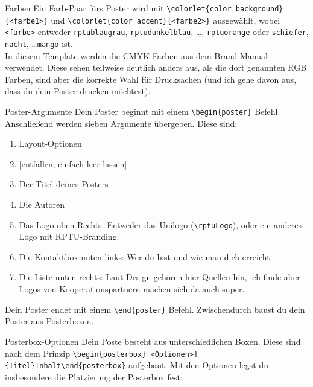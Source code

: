 \documentclass[
  a0paper,
  portrait,
  fontscale=.35 %
  ]{baposterrptu}
\begin{document}
\begin{poster}
\begin{posterbox}[name=farben,column=1,row=0]{Farben}
    Ein Farb-Paar fürs Poster wird mit \lstinline!\colorlet{color_background}{<farbe1>}! und \lstinline!\colorlet{color_accent}{<farbe2>}! ausgewählt, wobei \lstinline!<farbe>! entweder \lstinline!rptublaugrau!, \lstinline!rptudunkelblau!, \dots, \lstinline!rptuorange! oder \lstinline!schiefer!, \lstinline!nacht!, \dots \lstinline!mango! ist.\\

    In diesem Template werden die CMYK Farben aus dem Brand-Manual verwendet. Diese sehen teilweise deutlich anders aus, als die dort genannten RGB Farben, sind aber die korrekte Wahl für Drucksachen (und ich gehe davon aus, dass du dein Poster drucken möchtest).

  \end{posterbox}

  \begin{posterbox}[name=poster-optionen,column=0,below=intro, span=1]{Poster-Argumente}
    Dein Poster beginnt mit einem \lstinline!\begin{poster}! Befehl. Anschließend werden sieben Argumente übergeben. Diese sind:
    \begin{enumerate}
      \item Layout-Optionen
      \item {[entfallen, einfach leer lassen]}
      \item Der Titel deines Posters
      \item Die Autoren
      \item Das Logo oben Rechts: Entweder das Unilogo (\lstinline!\rptuLogo!), oder ein anderes Logo mit RPTU-Branding.
      \item Die Kontaktbox unten links: Wer du bist und wie man dich erreicht.
      \item Die Liste unten rechts: Laut Design gehören hier Quellen hin, ich finde aber Logos von Kooperationspartnern machen sich da auch super.
    \end{enumerate}
    Dein Poster endet mit einem \lstinline!\end{poster}! Befehl. Zwischendurch baust du dein Poster aus Posterboxen.
  \end{posterbox}

  \begin{posterbox}[below=poster-optionen, column=0]{Posterbox-Optionen}
    Dein Poste besteht aus unterschiedlichen Boxen. Diese sind nach dem Prinzip \lstinline!\begin{posterbox}[<Optionen>]{Titel}Inhalt\end{posterbox}! aufgebaut. Mit den Optionen legst du insbesondere die Platzierung der Posterbox fest:\\


\end{posterbox}
\end{poster}
\end{document}
